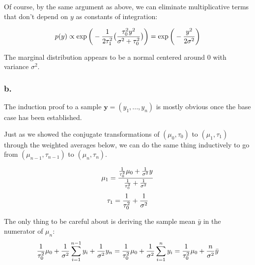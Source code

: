 \documentclass{article}
\begin{document}
Of course, by the same argument as above, we can eliminate multiplicative terms that don't depend on \(y\) as 
constants of integration:

\begin{equation}
p(y) \propto \exp{\bigg(-{1 \over 2\tau_1^2}\big({\tau_0^2y^2 \over \sigma^2 + \tau_0^2}\big) \bigg)} = 
\exp{\bigg(-{y^2 \over 2\sigma^2} \bigg)}
\end{equation}

The marginal distribution appears to be a normal centered around 0 with variance \(\sigma^2\).

\subsubsection{b.}

The induction proof to a sample \(\textbf{y} = (y_1, ..., y_n)\) is mostly obvious once the base case has been established.

Just as we showed the conjugate transformations of \((\mu_0, \tau_0)\) to \((\mu_1, \tau_1)\)
through the weighted averages below, we can do the same thing 
inductively to go from \((\mu_{n-1}, \tau_{n-1})\) to \((\mu_n, \tau_n)\).

\begin{equation}
\mu_1 = {{ 1 \over \tau_0^2}\mu_0 + {1 \over \sigma^2}y \over {1 \over \tau_0^2} + {1 \over \sigma^2}}
\end{equation}
\begin{equation}
\tau_1 = {1 \over \tau_0^2} + {1 \over \sigma^2}
\end{equation}

The only thing to be careful about is deriving the sample mean \(\bar{y}\) in the numerator of \(\mu_n\):
\begin{equation}
{ 1 \over \tau_0^2}\mu_0 + {1 \over \sigma^2}\sum_{i=1}^{n-1}{y_i} + {1 \over \sigma^2}y_n
= { 1 \over \tau_0^2}\mu_0 + {1 \over \sigma^2}\sum_{i=1}^{n}{y_i}
= { 1 \over \tau_0^2}\mu_0 + {n \over \sigma^2}{\bar{y}}
\end{equation}
\end{document}
